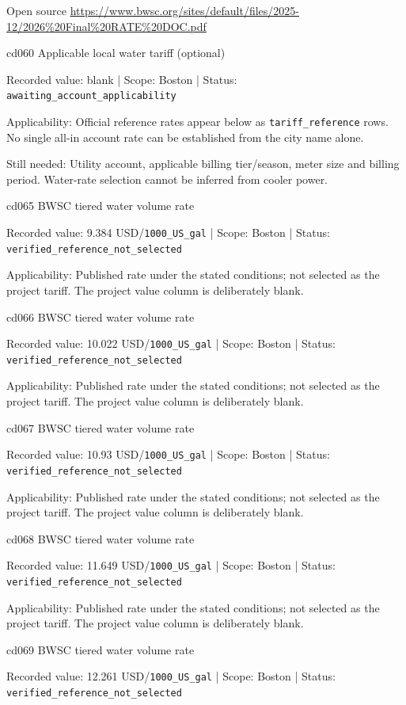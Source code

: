 Open source  \url{https://www.bwsc.org/sites/default/files/2025-12/2026%20Final%20RATE%20DOC.pdf}

cd060  Applicable local water tariff (optional)

Recorded value: blank | Scope: Boston | Status: \nolinkurl{awaiting_account_applicability}

Applicability: Official reference rates appear below as \nolinkurl{tariff_reference} rows. No single all-in account rate can be established from the city name alone.

Still needed: Utility account, applicable billing tier/season, meter size and billing period. Water-rate selection cannot be inferred from cooler power.

cd065  BWSC tiered water volume rate

Recorded value: 9.384 USD/\nolinkurl{1000_US_gal} | Scope: Boston | Status: \nolinkurl{verified_reference_not_selected}

Applicability: Published rate under the stated conditions; not selected as the project tariff. The project value column is deliberately blank.

cd066  BWSC tiered water volume rate

Recorded value: 10.022 USD/\nolinkurl{1000_US_gal} | Scope: Boston | Status: \nolinkurl{verified_reference_not_selected}

Applicability: Published rate under the stated conditions; not selected as the project tariff. The project value column is deliberately blank.

cd067  BWSC tiered water volume rate

Recorded value: 10.93 USD/\nolinkurl{1000_US_gal} | Scope: Boston | Status: \nolinkurl{verified_reference_not_selected}

Applicability: Published rate under the stated conditions; not selected as the project tariff. The project value column is deliberately blank.

cd068  BWSC tiered water volume rate

Recorded value: 11.649 USD/\nolinkurl{1000_US_gal} | Scope: Boston | Status: \nolinkurl{verified_reference_not_selected}

Applicability: Published rate under the stated conditions; not selected as the project tariff. The project value column is deliberately blank.

cd069  BWSC tiered water volume rate

Recorded value: 12.261 USD/\nolinkurl{1000_US_gal} | Scope: Boston | Status: \nolinkurl{verified_reference_not_selected}

